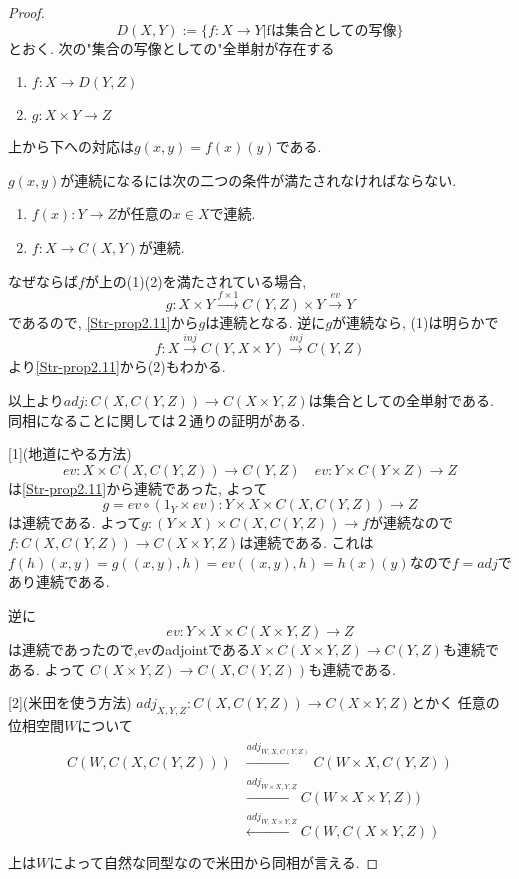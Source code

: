 \documentclass[dvipdfmx,a4paper,11pt]{article}
\theoremstyle{definition}
\begin{document}
\begin{proof}
$$
D(X,Y):=\{ f : X \to Y| \text{fは集合としての写像}\}
$$
とおく.
次の"集合の写像としての"全単射が存在する
\begin{enumerate}
\item $f : X \to D(Y,Z)$
\item $g : X \times Y \to Z$
\end{enumerate}
上から下への対応は$g(x,y) =f(x)(y)$である.

$g(x,y)$が連続になるには次の二つの条件が満たされなければならない. 
\begin{enumerate}
\item $f(x) : Y \to Z$が任意の$x \in X$で連続.
\item $f : X \to C(X,Y)$が連続.
\end{enumerate}
なぜならば$f$が上の(1)(2)を満たされている場合, 
$$
g : X \times Y \overset{f \times 1}{\longrightarrow}C(Y,Z) \times Y  \overset{ev }{\longrightarrow} Y
$$
であるので, \ref{Str-prop2.11}から$g$は連続となる. 
逆に$g$が連続なら, (1)は明らかで
$$
f : X \overset{inj}{\longrightarrow}C(Y,X \times Y)  \overset{inj}{\longrightarrow} C(Y,Z)
$$
より\ref{Str-prop2.11}から(2)もわかる. 

以上より$adj: C(X, C(Y,Z)) \to C(X \times Y, Z) $は集合としての全単射である. 
同相になることに関しては２通りの証明がある.

[1](地道にやる方法)
$$
ev : X \times C(X, C(Y,Z)) \to C(Y,Z) \quad ev : Y \times C(Y \times Z) \to Z
$$
は\ref{Str-prop2.11}から連続であった, 
よって
$$
g = ev \circ (1_{Y} \times ev) : Y \times X \times C(X,C(Y,Z)) \to Z
$$
は連続である. 
よって$g :  (Y \times X )\times C(X,C(Y,Z)) \to f$が連続なので
$f : C(X,C(Y,Z)) \to C(X \times Y, Z)$は連続である.
これは$f(h)(x,y) = g((x,y), h) = ev((x,y), h) =h(x)(y)$なので$f = adj$であり連続である.

逆に
$$
ev : Y \times X \times C(X\times Y, Z) \to Z
$$
は連続であったので,evのadjointである$X \times C(X \times Y , Z) \to C(Y,Z)$も連続である.
よって
$C(X \times Y , Z) \to C(X, C(Y,Z))$も連続である.

[2](米田を使う方法)
$adj_{X,Y,Z}: C(X, C(Y,Z)) \to C(X \times Y, Z) $とかく
任意の位相空間$W$について
\begin{align*}
\begin{split}
C(W, C(X, C(Y,Z)))
&\overset{adj_{W,X,C(Y,Z)}}{\longrightarrow} 
C(W\times X , C(Y,Z))\\
&\overset{adj_{W\times X,Y,Z}}{\longrightarrow} 
C(W\times X  \times Y,Z))\\
&\overset{adj_{W,X\times Y,Z}}{\longleftarrow} 
C(W, C(X \times Y,Z))\\
\end{split}
\end{align*}
上は$W$によって自然な同型なので米田から同相が言える. 
\end{proof}
\end{document}
